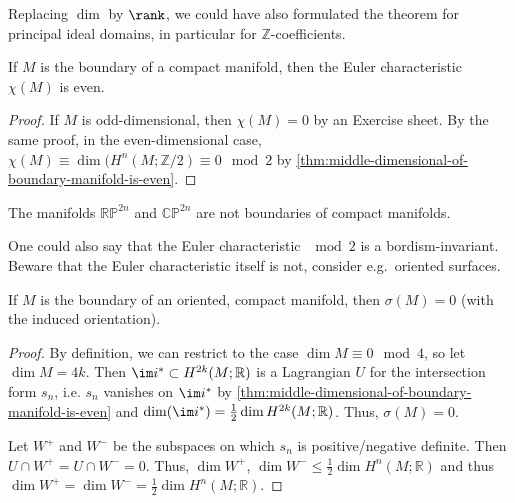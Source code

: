\begin{remark}
  Replacing $\dim$ by $\rank$, we could have also formulated
  the theorem for principal ideal domains,
  in particular for $\mathbb{Z}$-coefficients.
\end{remark}

\begin{corollary}
  If $M$ is the boundary of a compact manifold,
  then the Euler characteristic $\chi(M)$ is even.
\end{corollary}

\begin{proof}
  If $M$ is odd-dimensional,
  then $\chi(M) = 0$ by an Exercise sheet.
  By the same proof, in the even-dimensional case,
  $\chi(M) \equiv \dim (H^n (M ; \mathbb{Z} / 2) \equiv 0 \mod 2$ by
  \autoref{thm:middle-dimensional-of-boundary-manifold-is-even}.
\end{proof}

\begin{corollary}
  The manifolds $\mathbb{R}\mathbb{P}^{2n}$ and $\mathbb{C}\mathbb{P}^{2n}$
  are not boundaries of compact manifolds.
\end{corollary}

\begin{remark}
  One could also say that the Euler characteristic $\mod 2$ is a
  bordism-invariant.
  Beware that the Euler characteristic itself is not,
  consider e.g.~oriented surfaces.
\end{remark}

\begin{corollary}
  If $M$ is the boundary of an oriented,
  compact manifold, then $σ(M) = 0$
  (with the induced orientation).
\end{corollary}

\begin{proof}
  By definition, we can restrict to the case $\dim M \equiv 0 \mod 4$,
  so let $\dim M = 4k$.
  Then $\im i^* \subset H^{2k}(M ; \mathbb{R})$ is a Lagrangian $U$
  for the intersection form $s_n$, i.e. $s_n$ vanishes on
  $\im i^*$ by
  \autoref{thm:middle-dimensional-of-boundary-manifold-is-even}
  and $\dim ( \im i^*) = \frac{1}{2} \dim H^{2k}(M ; \mathbb{R})$.
  Thus, $σ(M) = 0$.

  Let $W^+$ and $W^-$ be the subspaces on which $s_n$ is
  positive/negative definite.
  Then $U\cap W^+ = U \cap W^- = 0$.
  Thus, $\dim W^+$, $\dim W^- \leq \frac{1}{2} \dim H^n(M ; \mathbb{R})$
  and thus $\dim W^+ = \dim W^- = \frac{1}{2} \dim H^n(M; \mathbb{R})$.
\end{proof}

